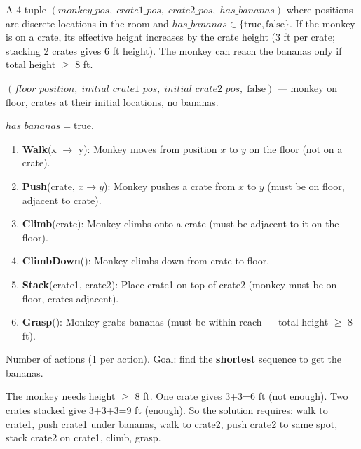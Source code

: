 \documentclass[12pt, a4paper]{article}
\begin{document}
\begin{description}[leftmargin=3.6cm, labelwidth=3.4cm, labelsep=0.2cm]
  \item[\textbf{State:}]
    A 4-tuple $(\mathit{monkey\_pos},\; \mathit{crate1\_pos},\; \mathit{crate2\_pos},\; \mathit{has\_bananas})$ where positions are discrete locations in the room and $\mathit{has\_bananas} \in \{\text{true}, \text{false}\}$. If the monkey is on a crate, its effective height increases by the crate height (3 ft per crate; stacking 2 crates gives 6 ft height). The monkey can reach the bananas only if total height $\geq$ 8 ft.

  \item[\textbf{Initial state:}]
    $(\mathit{floor\_position},\; \mathit{initial\_crate1\_pos},\; \mathit{initial\_crate2\_pos},\; \text{false})$ — monkey on floor, crates at their initial locations, no bananas.

  \item[\textbf{Goal test:}]
    $\mathit{has\_bananas} = \text{true}$.

  \item[\textbf{Successor function (operators):}]
    \begin{enumerate}[noitemsep]
      \item \textbf{Walk}(x $\to$ y): Monkey moves from position $x$ to $y$ on the floor (not on a crate).
      \item \textbf{Push}(crate, $x \to y$): Monkey pushes a crate from $x$ to $y$ (must be on floor, adjacent to crate).
      \item \textbf{Climb}(crate): Monkey climbs onto a crate (must be adjacent to it on the floor).
      \item \textbf{ClimbDown}(): Monkey climbs down from crate to floor.
      \item \textbf{Stack}(crate1, crate2): Place crate1 on top of crate2 (monkey must be on floor, crates adjacent).
      \item \textbf{Grasp}(): Monkey grabs bananas (must be within reach — total height $\geq$ 8 ft).
    \end{enumerate}

  \item[\textbf{Path cost:}]
    Number of actions (1 per action). Goal: find the \textbf{shortest} sequence to get the bananas.

  \item[\textbf{Key insight:}]
    The monkey needs height $\geq$ 8 ft. One crate gives 3+3=6 ft (not enough). Two crates stacked give 3+3+3=9 ft (enough). So the solution requires: walk to crate1, push crate1 under bananas, walk to crate2, push crate2 to same spot, stack crate2 on crate1, climb, grasp.
\end{description}
\end{document}
